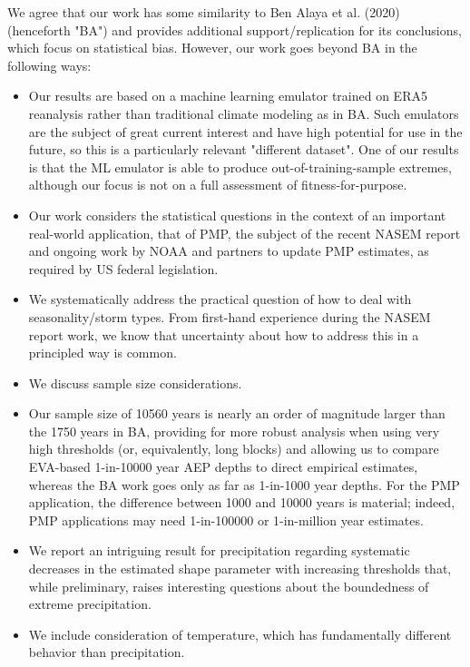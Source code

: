 \documentclass[12pt,english]{reviewresponse}
\begin{document}
\begin{revresponse}

We agree that our work has some similarity to Ben Alaya et al. (2020) (henceforth "BA") and provides additional support/replication for its conclusions, which focus on statistical bias. However, our work goes beyond BA in the following ways:

\begin{itemize}
\item Our results are based on a machine learning  emulator trained on ERA5 reanalysis rather than traditional climate modeling as in BA. Such emulators are the subject of great current interest and have high potential for use in the future, so this is a particularly relevant "different dataset". One of our results is that the ML emulator is able to produce out-of-training-sample extremes, although our focus is not on a full assessment of fitness-for-purpose.
\item Our work considers the statistical questions in the context of an important real-world application, that of PMP, the subject of the recent NASEM report and ongoing work by NOAA and partners to update PMP estimates, as required by US federal legislation.
\item We systematically address the practical question of how to deal with seasonality/storm types. From first-hand experience during the NASEM report work, we know that uncertainty about how to address this in a principled way is common.
\item We discuss sample size considerations.
\item Our sample size of 10560 years is nearly an order of magnitude larger than the 1750 years in BA, providing for more robust analysis when using very high thresholds (or, equivalently, long blocks) and allowing us to compare EVA-based 1-in-10000 year AEP depths to direct empirical estimates, whereas the BA work goes only as far as 1-in-1000 year depths. For the PMP application, the difference between 1000 and 10000 years is material; indeed, PMP applications may need 1-in-100000 or 1-in-million year estimates.  
\item We report an intriguing result for precipitation regarding systematic decreases in the estimated shape parameter with increasing thresholds that, while preliminary, raises interesting questions about the boundedness of extreme precipitation.
\item We include consideration of temperature, which has fundamentally different behavior than precipitation.
\end{itemize}


\end{revresponse}
\end{document}
